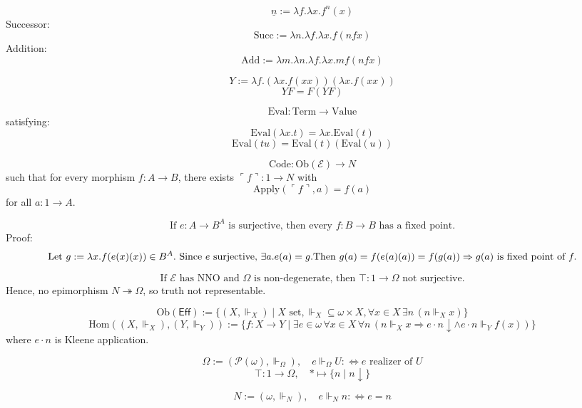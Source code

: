 \documentclass{article}
\begin{document}
\[
\underline{n} := \lambda f . \lambda x . f^n(x)
\]
Successor:
\[
\text{Succ} := \lambda n . \lambda f . \lambda x . f (n f x)
\]
Addition:
\[
\text{Add} := \lambda m . \lambda n . \lambda f . \lambda x . m f (n f x)
\]

\[
Y := \lambda f . (\lambda x . f (x x)) (\lambda x . f (x x))
\]
\[
Y F = F (Y F)
\]

\[
\text{Eval} : \text{Term} \to \text{Value}
\]
satisfying:
\[
\text{Eval}(\lambda x . t) = \lambda x . \text{Eval}(t)
\]
\[
\text{Eval}(t u) = \text{Eval}(t)(\text{Eval}(u))
\]

\[
\text{Code} : \text{Ob}(\mathcal{E}) \to N
\]
such that for every morphism $f : A \to B$, there exists $\ulcorner f \urcorner : 1 \to N$ with
\[
\text{Apply}(\ulcorner f \urcorner, a) = f(a)
\]
for all $a : 1 \to A$.

\[
\text{If } e : A \to B^A \text{ is surjective, then every } f : B \to B \text{ has a fixed point.}
\]
Proof:
\[
\text{Let } g := \lambda x . f(e(x)(x)) \in B^A. \text{ Since } e \text{ surjective, } \exists a . e(a) = g. \\
\text{Then } g(a) = f(e(a)(a)) = f(g(a)) \Rightarrow g(a) \text{ is fixed point of } f.
\]

\[
\text{If } \mathcal{E} \text{ has NNO and } \Omega \text{ is non-degenerate, then } \top : 1 \to \Omega \text{ not surjective.}
\]
Hence, no epimorphism $N \twoheadrightarrow \Omega$, so truth not representable.

\[
\text{Ob}(\mathsf{Eff}) := \{ (X, \Vdash_X) \mid X \text{ set}, \Vdash_X \subseteq \omega \times X, \forall x \in X \, \exists n \, (n \Vdash_X x) \}
\]
\[
\text{Hom}((X, \Vdash_X), (Y, \Vdash_Y)) := \{ f : X \to Y \mid \exists e \in \omega \, \forall x \in X \, \forall n \, (n \Vdash_X x \Rightarrow e \cdot n \downarrow \land e \cdot n \Vdash_Y f(x)) \}
\]
where $e \cdot n$ is Kleene application.

\[
\Omega := (\mathcal{P}(\omega), \Vdash_\Omega), \quad e \Vdash_\Omega U :\Leftrightarrow e \text{ realizer of } U
\]
\[
\top : 1 \to \Omega, \quad * \mapsto \{ n \mid n \downarrow \}
\]

\[
N := (\omega, \Vdash_N), \quad e \Vdash_N n :\Leftrightarrow e = n
\]
\end{document}
